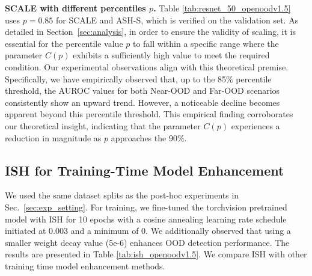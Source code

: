 \documentclass{article} %
\theoremstyle{plain}
\begin{document}
\textbf{SCALE with different percentiles $p$.}
Table \ref{tab:resnet_50_openoodv1.5} uses $p=0.85$ for SCALE and ASH-S, which is verified on the validation set. 
As detailed in Section~\ref{sec:analysis}, in order to ensure the validity of scaling, it is essential for the percentile value $p$ to fall within a specific range where the parameter $C(p)$ exhibits a sufficiently high value to meet the required condition. Our experimental observations align with this theoretical premise. Specifically, we have empirically observed that, up to the 85\% percentile threshold, the AUROC values for both Near-OOD and Far-OOD scenarios consistently show an upward trend. However, a noticeable decline becomes apparent beyond this percentile threshold. This empirical finding corroborates our theoretical insight, indicating that the parameter $C(p)$ experiences a reduction in magnitude as $p$ approaches the 90\%.

\vspace{2em}
\begin{table}[h!]
\centering 
{}
\caption{FPR@95 / AUROC results on ImageNet benchmarks under different $p$.}
\end{table}



\subsection{ISH for Training-Time Model Enhancement}
We used the same dataset splits as the post-hoc experiments in Sec.~\ref{sec:exp_setting}. For training, we fine-tuned the torchvision pretrained model with ISH for 10 epochs with a cosine annealing learning rate schedule initiated at 0.003 and a minimum of 0. We additionally observed that using a smaller weight decay value (5e-6) enhances OOD detection performance. %
The results are presented in Table \ref{tab:ish_openoodv1.5}. We compare ISH with other training time model enhancement methods.
\end{document}

